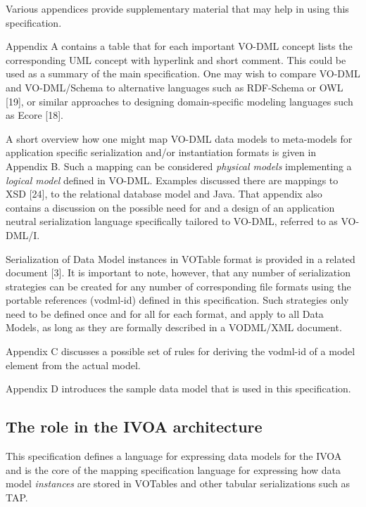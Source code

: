 \documentclass[10pt,a4paper]{ivoa}
\begin{document}
Various appendices provide supplementary material that may help in using
this specification.

Appendix A contains a table that for each important VO-DML concept lists
the corresponding UML concept with hyperlink and short comment. This
could be used as a summary of the main specification. One may wish to
compare VO-DML and VO-DML/Schema to alternative languages such as
RDF-Schema or OWL {[}19{]}, or similar approaches to designing
domain-specific modeling languages such as Ecore {[}18{]}.

A short overview how one might map VO-DML data models to meta-models for
application specific serialization and/or instantiation formats is given
in Appendix B. Such a mapping can be considered \emph{physical models}
implementing a \emph{logical model} defined in VO-DML. Examples
discussed there are mappings to XSD {[}24{]}, to the relational database
model and Java. That appendix also contains a discussion on the possible
need for and a design of an application neutral serialization language
specifically tailored to VO-DML, referred to as VO-DML/I.

Serialization of Data Model instances in VOTable format is provided in a
related document {[}3{]}. It is important to note, however, that any
number of serialization strategies can be created for any number of
corresponding file formats using the portable references (vodml-id)
defined in this specification. Such strategies only need to be defined
once and for all for each format, and apply to all Data Models, as long
as they are formally described in a VODML/XML document.

Appendix C discusses a possible set of rules for deriving the vodml-id
of a model element from the actual model.

Appendix D introduces the sample data model that is used in this
specification.

\hypertarget{the-role-in-the-ivoa-architecture}{%
\subsection{The role in the IVOA
architecture}\label{the-role-in-the-ivoa-architecture}}

This specification defines a language for expressing data models for the
IVOA and is the core of the mapping specification language for
expressing how data model \emph{instances} are stored in VOTables and
other tabular serializations such as TAP.
\end{document}
